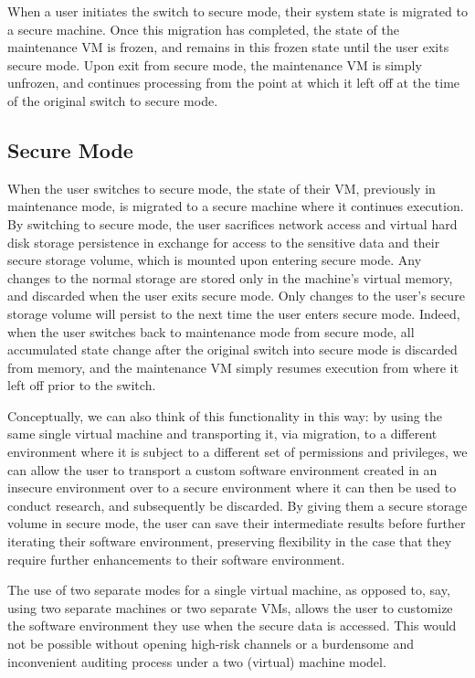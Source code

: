 \documentclass{acm_proc_article-sp}
\begin{document}
When a user initiates the switch to secure mode, their system state is migrated
to a secure machine.  Once this migration has completed, the state of the
maintenance VM is frozen, and remains in this frozen state until the user exits
secure mode.  Upon exit from secure mode, the maintenance VM is simply unfrozen,
and continues processing from the point at which it left off at the time of the
original switch to secure mode.

\subsection{Secure Mode}

When the user switches to secure mode, the state of their VM, previously in
maintenance mode, is migrated to a secure machine where it continues execution.
By switching to secure mode, the user sacrifices network access and virtual hard
disk storage persistence in exchange for access to the sensitive data and their
secure storage volume, which is mounted upon entering secure mode.  Any changes
to the normal storage are stored only in the machine's virtual memory, and
discarded when the user exits secure mode.  Only changes to the user's secure
storage volume will persist to the next time the user enters secure mode.
Indeed, when the user switches back to maintenance mode from secure mode, all
accumulated state change after the original switch into secure mode is discarded
from memory, and the maintenance VM simply resumes execution from where it left
off prior to the switch.

Conceptually, we can also think of this functionality in this way: by using the
same single virtual machine and transporting it, via migration, to a different
environment where it is subject to a different set of permissions and
privileges, we can allow the user to transport a custom software environment
created in an insecure environment over to a secure environment where it can
then be used to conduct research, and subsequently be discarded.  By giving them
a secure storage volume in secure mode, the user can save their intermediate
results before further iterating their software environment, preserving
flexibility in the case that they require further enhancements to their
software environment.

The use of two separate modes for a single virtual machine, as opposed to, say,
using two separate machines or two separate VMs, allows the user to customize
the software environment they use when the secure data is accessed.  This would
not be possible without opening high-risk channels or a burdensome and
inconvenient auditing process under a two (virtual) machine model.
\end{document}
